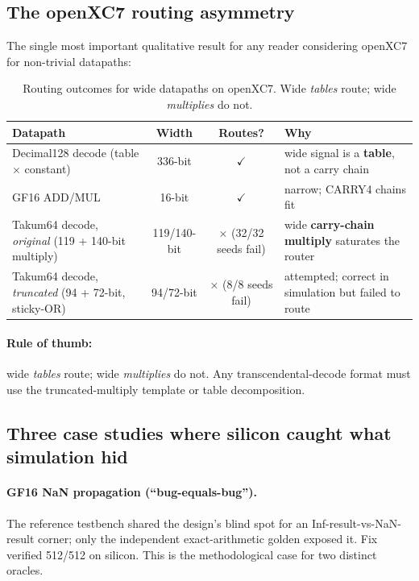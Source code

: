 \documentclass[11pt]{article}
\begin{document}
\subsection{The openXC7 routing asymmetry}

The single most important qualitative result for any reader considering openXC7
for non-trivial datapaths:

\begin{table}[h]
\centering
\small
\caption{Routing outcomes for wide datapaths on openXC7. Wide \emph{tables}
route; wide \emph{multiplies} do not.}
\label{tab:routing}
\begin{tabular}{p{5.4cm}c cp{3.6cm}}
\toprule
Datapath & Width & Routes? & Why \\
\midrule
Decimal128 decode (table $\times$ constant) & 336-bit & $\checkmark$ & wide signal is a \textbf{table}, not a carry chain \\
GF16 ADD/MUL & 16-bit & $\checkmark$ & narrow; CARRY4 chains fit \\
Takum64 decode, \emph{original} (119 + 140-bit multiply) & 119/140-bit & $\times$ (32/32 seeds fail) & wide \textbf{carry-chain multiply} saturates the router \\
Takum64 decode, \emph{truncated} (94 + 72-bit, sticky-OR) & 94/72-bit & $\times$ (8/8 seeds fail) & attempted; correct in simulation but failed to route \\
\bottomrule
\end{tabular}
\end{table}

\paragraph{Rule of thumb:} wide \emph{tables} route; wide \emph{multiplies} do
not. Any transcendental-decode format must use the truncated-multiply template
or table decomposition.

\subsection{Three case studies where silicon caught what simulation hid}\label{sec:results-case}

\paragraph{GF16 NaN propagation (``bug-equals-bug'').} The reference testbench
shared the design's blind spot for an Inf-result-vs-NaN-result corner; only the
independent exact-arithmetic golden exposed it. Fix verified 512/512 on silicon.
This is the methodological case for two distinct oracles.
\end{document}
